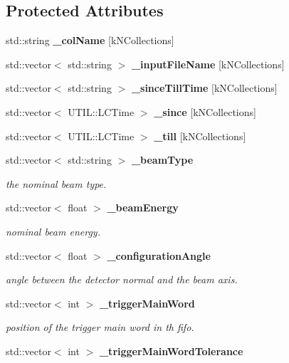 \subsection*{Protected Attributes}
\begin{DoxyCompactItemize}
\item 
std::string {\bfseries \_\-colName} [kNCollections]\label{classmarlin_1_1CaliceConditionsDataCreator_a1c7c2ec9238554a06a8850b0679b66f9}

\item 
std::vector$<$ std::string $>$ {\bfseries \_\-inputFileName} [kNCollections]\label{classmarlin_1_1CaliceConditionsDataCreator_a91361a635c7673038c4482ad8209f639}

\item 
std::vector$<$ std::string $>$ {\bfseries \_\-sinceTillTime} [kNCollections]\label{classmarlin_1_1CaliceConditionsDataCreator_a5dd2783bec7e29c83911b2c62a5733ea}

\item 
std::vector$<$ UTIL::LCTime $>$ {\bfseries \_\-since} [kNCollections]\label{classmarlin_1_1CaliceConditionsDataCreator_afb8943272775c52775822d64f0445505}

\item 
std::vector$<$ UTIL::LCTime $>$ {\bfseries \_\-till} [kNCollections]\label{classmarlin_1_1CaliceConditionsDataCreator_a6c8842188702a4d711ece614f93c0d88}

\item 
std::vector$<$ std::string $>$ {\bf \_\-beamType}
\begin{DoxyCompactList}\small\item\em the nominal beam type. \item\end{DoxyCompactList}\item 
std::vector$<$ float $>$ {\bf \_\-beamEnergy}
\begin{DoxyCompactList}\small\item\em nominal beam energy. \item\end{DoxyCompactList}\item 
std::vector$<$ float $>$ {\bf \_\-configurationAngle}
\begin{DoxyCompactList}\small\item\em angle between the detector normal and the beam axis. \item\end{DoxyCompactList}\item 
std::vector$<$ int $>$ {\bf \_\-triggerMainWord}
\begin{DoxyCompactList}\small\item\em position of the trigger main word in th fifo. \item\end{DoxyCompactList}\item 
std::vector$<$ int $>$ {\bf \_\-triggerMainWordTolerance}\label{classmarlin_1_1CaliceConditionsDataCreator_ae121828e72a6e69229ea1102e3cacc4c}


\end{DoxyCompactItemize}
